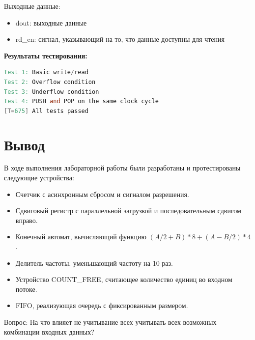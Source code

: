 \documentclass[12pt,onecolumn]{article}
\begin{document}
Выходные данные:
\begin{itemize}
    \item dout: выходные данные 
    \item rd\_en: сигнал, указывающий на то, что данные доступны для чтения
\end{itemize}
\textbf{Результаты тестирования:}
\begin{lstlisting}[language=verilog]
Test 1: Basic write/read
Test 2: Overflow condition
Test 3: Underflow condition
Test 4: PUSH and POP on the same clock cycle
[T=675] All tests passed
\end{lstlisting}



\section{Вывод}
В ходе выполнения лабораторной работы были разработаны и протестированы следующие устройства:
\begin{itemize}
  \item Счетчик с асинхронным сбросом и сигналом разрешения.
  \item Сдвиговый регистр с параллельной загрузкой и последовательным сдвигом вправо.
  \item Конечный автомат, вычисляющий функцию $(A/2+B)*8 + (A-B/2)*4$.
  \item Делитель частоты, уменьшающий частоту на 10 раз.
  \item Устройство COUNT\_FREE, считающее количество единиц во входном потоке.
  \item FIFO, реализующая очередь с фиксированным размером.
\end{itemize}
Вопрос: На что влияет не учитывание всех учитывать всех
возможных комбинации входных данных?
\end{document}
